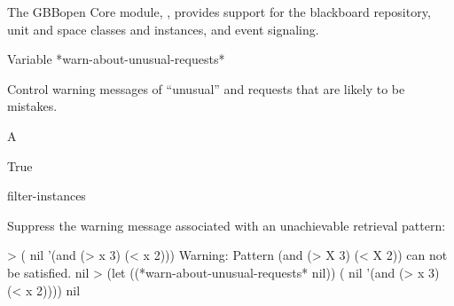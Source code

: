 \documentclass[10pt,twoside,english,pdftex]{article}
\begin{document}
%
%
The GBBopen Core module, , provides support for the
blackboard repository, unit and space classes and instances, and event
signaling.

\W\entities
\T\clearpage
\T\renewcommand{\headrulewidth}{0.01pt}


\begin{functiondoc}{Variable}%
{*warn-about-unusual-requests*}{}%

\fnsyntax

\fnpurpose Control warning messages of ``unusual''
\textbf{} and \textbf{}
requests that are likely to be mistakes.

\fnpackage {}

\fnmodule {}

\fnvaluetype A 

\fninitialvalue True

\begin{alsos}{filter-instances}
\end{alsos}

\fnexample
Suppress the warning message associated with an unachievable retrieval pattern:
\begin{example}
> ( nil '(and (> x 3) (< x 2)))
Warning: Pattern (and (> X 3) (< X 2)) can not be satisfied.
nil
> (let ((*warn-about-unusual-requests* nil))
    ( nil '(and (> x 3) (< x 2))))
nil
\end{example}

\end{functiondoc}

\end{document}
